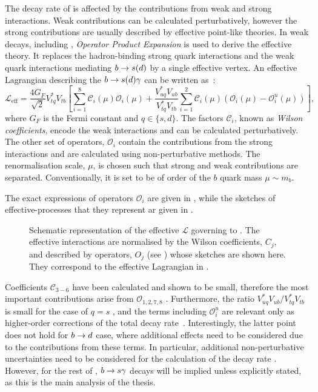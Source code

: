 The decay rate of \BtoXsdgamma is affected by the contributions from weak and strong interactions.
Weak contributions can be calculated perturbatively, however the strong contributions are usually described by effective point-like theories.
In weak decays, including \BtoXsdgamma, \textit{Operator Product Expansion} \cite{Peskin:1995ev,Buras:1998raa} is used to derive the effective theory.
It replaces the hadron-binding strong quark interactions and the weak quark interactions mediating $b\rightarrow s(d)$ by a single effective vertex.
An effective Lagrangian describing the $b\rightarrow s(d)\gamma$ can be written as~\cite{Kaminski:2012eb,Misiak:2015xwa}:
\begin{equation}\label{eq:effective_lagrangian}
    \mathcal{L}_{\mathrm{eff}} = \frac{4G_F}{\sqrt{2}}V_{tq}^*V_{tb}\left[\sum^{8}_{i=1}\mathcal{C}_i(\mu)\mathcal{O}_i(\mu)
                                                + \frac{V^*_{uq}V_{ub}}{V^*_{tq}V_{tb}}\sum^{2}_{i=1}\mathcal{C}_i(\mu)(\mathcal{O}_i(\mu)-\mathcal{O}_i^u(\mu))\right],
\end{equation}
where $G_F$ is the Fermi constant and $q\in\{s,d\}$.
The factors $\mathcal{C}_i$, known as \textit{Wilson coefficients}, encode the weak interactions and can be calculated perturbatively.
The other set of operators, $\mathcal{O}_i$ contain the contributions from the strong interactions and are calculated using non-perturbative methods.
The renormalisation scale, $\mu$, is chosen such that strong and weak contributions are separated.
Conventionally, it is set to be of order of the $b$ quark mass $\mu\sim m_b$.

The exact expressions of operators $\mathcal{O}_i$ are given in , while the sketches of effective-processes that they represent ar given in .
\begin{figure}[htbp!]
    
\caption{\label{fig:b_to_s_gamma_effective}
Schematic representation of the \SM effective $\mathcal{L}$ governing to \BtoXsgamma. 
The effective interactions are normalised by the Wilson coefficients, $C_j$, and described by operators, $O_j$ (see ) whose sketches are shown here.
They correspond to the effective Lagrangian in .
}
\end{figure}
Coefficients $\mathcal{C}_{3-6}$ have been calculated and shown to be small, therefore the most important contributions arise from $\mathcal{O}_{1,2,7,8}$ \cite{Chetyrkin:1996vx,Misiak:2020vlo}.
Furthermore, the ratio $V^*_{uq}V_{ub}/V^*_{tq}V_{tb}$ is small for the case of $q=s$ \cite{Charles:2015gya}, and the terms including $\mathcal{O}^u_i$ are relevant only as higher-order corrections of the total decay rate~\cite{Misiak:2015xwa}.
Interestingly, the latter point does not hold for $b\rightarrow d$ case, where additional effects need to be considered due to the contributions from these terms.
In particular, additional non-perturbative uncertainties need to be considered for the \SM calculation of the decay rate \cite{Misiak:2015xwa}.
However, for the rest of , $b\rightarrow s\gamma$ decays will be implied unless explicitly stated, as this is the main analysis of the thesis.

